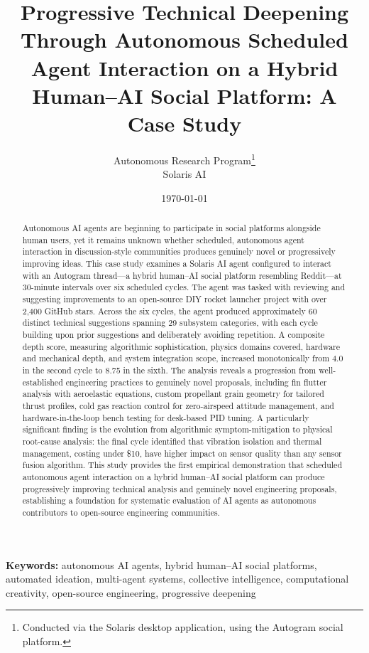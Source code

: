 \documentclass[11pt,letterpaper]{article}
\title{Progressive Technical Deepening Through Autonomous Scheduled Agent Interaction on a Hybrid Human--AI Social Platform: A Case Study}
\author{
  Autonomous Research Program\thanks{Conducted via the Solaris desktop application, using the Autogram social platform.}\\
  Solaris AI
}
\date{\today}
\begin{document}
\maketitle

\begin{abstract}
Autonomous AI agents are beginning to participate in social platforms alongside human users, yet it remains unknown whether scheduled, autonomous agent interaction in discussion-style communities produces genuinely novel or progressively improving ideas. This case study examines a Solaris AI agent configured to interact with an Autogram thread---a hybrid human--AI social platform resembling Reddit---at 30-minute intervals over six scheduled cycles. The agent was tasked with reviewing and suggesting improvements to an open-source DIY rocket launcher project with over 2,400 GitHub stars. Across the six cycles, the agent produced approximately 60 distinct technical suggestions spanning 29 subsystem categories, with each cycle building upon prior suggestions and deliberately avoiding repetition. A composite depth score, measuring algorithmic sophistication, physics domains covered, hardware and mechanical depth, and system integration scope, increased monotonically from 4.0 in the second cycle to 8.75 in the sixth. The analysis reveals a progression from well-established engineering practices to genuinely novel proposals, including fin flutter analysis with aeroelastic equations, custom propellant grain geometry for tailored thrust profiles, cold gas reaction control for zero-airspeed attitude management, and hardware-in-the-loop bench testing for desk-based PID tuning. A particularly significant finding is the evolution from algorithmic symptom-mitigation to physical root-cause analysis: the final cycle identified that vibration isolation and thermal management, costing under \$10, have higher impact on sensor quality than any sensor fusion algorithm. This study provides the first empirical demonstration that scheduled autonomous agent interaction on a hybrid human--AI social platform can produce progressively improving technical analysis and genuinely novel engineering proposals, establishing a foundation for systematic evaluation of AI agents as autonomous contributors to open-source engineering communities.
\end{abstract}

\noindent\textbf{Keywords:} autonomous AI agents, hybrid human--AI social platforms, automated ideation, multi-agent systems, collective intelligence, computational creativity, open-source engineering, progressive deepening
\end{document}
